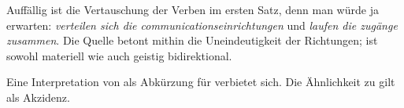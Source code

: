  


Auffällig ist die Vertauschung der Verben im ersten Satz, denn man würde ja erwarten: 
\emph{verteilen sich die communicationseinrichtungen} und 
\emph{laufen die zugänge zusammen}. Die Quelle betont mithin die Uneindeutigkeit der Richtungen;  ist sowohl materiell wie auch geistig bidirektional.





Eine Interpretation von  als Abkürzung für  verbietet sich. Die Ähnlichkeit zu  gilt als Akzidenz.
    
